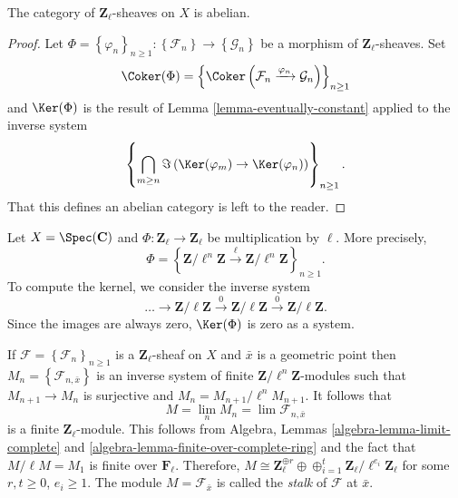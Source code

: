 \begin{lemma}
\label{lemma-l-adic-abelian}
The category of $\mathbf{Z}_\ell$-sheaves on $X$ is abelian.
\end{lemma}

\begin{proof}
Let
$\Phi = \left\{\varphi_n\right\}_{n\geq 1} :
\left\{\mathcal{F}_n\right\}
\to
\left\{\mathcal{G}_n\right\}$
be a morphism of $\mathbf{Z}_\ell$-sheaves. Set
$$
\Coker(\Phi) =
\left\{
\Coker\left(\mathcal{F}_n \xrightarrow{\varphi_n} \mathcal{G}_n\right)
\right\}_{n\geq 1}
$$
and $\Ker(\Phi)$ is the result of
Lemma \ref{lemma-eventually-constant}
applied to the inverse system
$$
\left\{
\bigcap_{m\geq n}
\Im\left(\Ker(\varphi_m) \to \Ker(\varphi_n)\right)
\right\}_{n \geq 1}.
$$
That this defines an abelian category is left to the reader.
\end{proof}

\begin{example}
\label{example-kernel}
Let $X=\Spec(\mathbf{C})$ and $\Phi : \mathbf{Z}_\ell\to \mathbf{Z}_\ell$
be multiplication by $\ell$. More precisely,
$$
\Phi = \left\{ \mathbf{Z}/\ell^n\mathbf{Z} \xrightarrow{\ell}
\mathbf{Z}/\ell^n\mathbf{Z}\right\}_{n \geq 1}.
$$
To compute the kernel, we consider the inverse system
$$
\ldots\to \mathbf{Z}/\ell\mathbf{Z}\xrightarrow{0}
\mathbf{Z}/\ell\mathbf{Z}\xrightarrow{0}\mathbf{Z}/\ell\mathbf{Z}.
$$
Since the images are always zero, $\Ker(\Phi)$ is zero as a system.
\end{example}

\begin{remark}
\label{remark-stalk-l-adic-sheaf}
If $\mathcal{F} = \left\{\mathcal{F}_n\right\}_{n\geq 1}$ is a
$\mathbf{Z}_\ell$-sheaf on $X$ and $\bar x$ is a geometric point then
$M_n = \left\{\mathcal{F}_{n, \bar x}\right\}$ is an inverse system of finite
$\mathbf{Z}/\ell^n\mathbf{Z}$-modules such that $M_{n+1}\to M_n$ is surjective
and $M_n = M_{n+1}/\ell^n M_{n+1}$. It follows that
$$
M = \lim_n M_n = \lim \mathcal{F}_{n, \bar x}
$$
is a finite $\mathbf{Z}_\ell$-module. This follows from
Algebra, Lemmas \ref{algebra-lemma-limit-complete} and
\ref{algebra-lemma-finite-over-complete-ring} and the fact that
$M/\ell M = M_1$ is finite over $\mathbf{F}_\ell$.
Therefore, $M\cong \mathbf{Z}_\ell^{\oplus r} \oplus \oplus_{i = 1}^t
\mathbf{Z}_\ell/\ell^{e_i}\mathbf{Z}_\ell$ for some $r, t\geq 0$, $e_i\geq 1$.
The module $M = \mathcal{F}_{\bar x}$ is called the {\it stalk} of
$\mathcal{F}$ at $\bar x$.
\end{remark}


